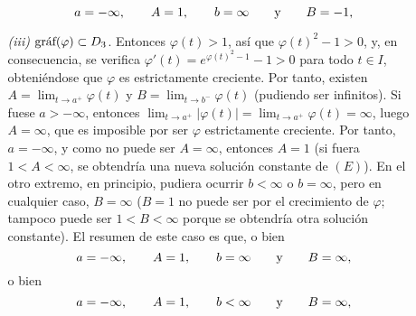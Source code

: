 \documentclass[11pt]{report}
\begin{document}
\begin{itemize}
\begin{itemize}
    \[a=-\infty, \qquad A=1, \qquad b=\infty \qquad \textup{y} \qquad B=-1,\]
    \item[\textit{(iii)}] $\textup{gráf}(\varphi) \subset D_3$. Entonces $\varphi(t)>1$, así que $\varphi(t)^2-1>0$, y, en consecuencia, se verifica $\varphi'(t)=e^{\varphi(t)^2-1}-1>0$ para todo $t \in I$, obteniéndose que $\varphi$ es estrictamente creciente. Por tanto, existen $A=\lim_{t \to a^+}\varphi(t)$ y $B=\lim_{t \to b^{-}}\varphi(t)$ (pudiendo ser infinitos). Si fuese $a>-\infty$, entonces $\lim_{t \to a^{+}} |\varphi(t)|=\lim_{t \to a^{+}} \varphi(t)=\infty$, luego $A=\infty$, que es imposible por ser $\varphi$ estrictamente creciente. Por tanto, $a=-\infty$, y como no puede ser $A=\infty$, entonces $A=1$ (si fuera $1<A<\infty$, se obtendría una nueva solución constante de $(E)$). En el otro extremo, en principio, pudiera ocurrir $b<\infty$ o $b=\infty$, pero en cualquier caso, $B=\infty$ ($B=1$ no puede ser por el crecimiento de $\varphi$; tampoco puede ser $1<B<\infty$ porque se obtendría otra solución constante). El resumen de este caso es que, o bien
    \[a=-\infty, \qquad A=1, \qquad b=\infty \qquad \textup{y} \qquad B=\infty,\]
    o bien
    \[a=-\infty, \qquad A=1, \qquad b<\infty \qquad \textup{y} \qquad B=\infty,\]
\end{itemize}


\end{itemize}
\end{document}
